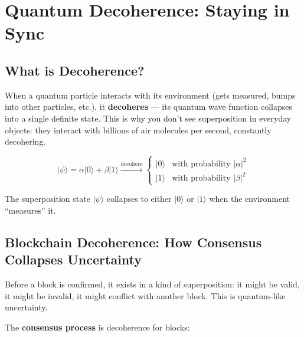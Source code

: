 \documentclass[11pt,a4paper]{article}
\begin{document}
\section{Quantum Decoherence: Staying in Sync}

\subsection{What is Decoherence?}

When a quantum particle interacts with its environment (gets measured, bumps into other particles, etc.), it \textbf{decoheres} --- its quantum wave function collapses into a single definite state. This is why you don't see superposition in everyday objects: they interact with billions of air molecules per second, constantly decohering.

\begin{equation}
|\psi\rangle = \alpha|0\rangle + \beta|1\rangle \xrightarrow{\text{decohere}} \begin{cases} |0\rangle & \text{with probability } |\alpha|^2 \\ |1\rangle & \text{with probability } |\beta|^2 \end{cases}
\end{equation}

The superposition state $|\psi\rangle$ collapses to either $|0\rangle$ or $|1\rangle$ when the environment ``measures'' it.

\subsection{Blockchain Decoherence: How Consensus Collapses Uncertainty}

Before a block is confirmed, it exists in a kind of superposition: it might be valid, it might be invalid, it might conflict with another block. This is quantum-like uncertainty.

The \textbf{consensus process} is decoherence for blocks:
\end{document}
